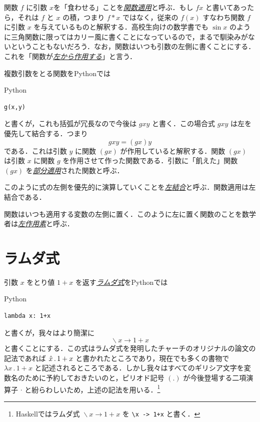 \documentclass[a4paper]{jsbook}
\newcommand{\programminglanguage}[1]{\textsf{#1}}
\newcommand{\haskell}{\programminglanguage{Haskell}}
\newcommand{\python}{\programminglanguage{Python}}
\newcommand{\keyword}[1]{{\underline{\emph{#1}}}}
\newcommand{\code}[1]{\texttt{#1}}
\newenvironment{pythoncode}{\begin{itembox}[r]{\python}}{\end{itembox}}
\DeclareMathOperator{\mLambda}{\backslash}
\DeclareMathOperator{\mLambdaArrow}{\rightarrow}
\newcommand{\mLambdaExp}[2]{\mLambda{#1}\mLambdaArrow{#2}}
\begin{document}

関数 $f$ に引数 $x$を「食わせる」ことを\keyword{関数適用}と呼ぶ．もし $fx$ と書いてあったら，それは $f$ と $x$ の積，つまり $f*x$ ではなく，従来の $f(x)$ すなわち関数 $f$ に引数 $x$ を与えているものと解釈する．高校生向けの数学書でも $\sin x$ のように三角関数に限ってはカリー風に書くことになっているので，まるで馴染みがないということもないだろう．なお，関数はいつも引数の左側に書くことにする．これを「関数が\keyword{左から作用する}」と言う．

複数引数をとる関数を\python では
\begin{pythoncode}
\begin{verbatim}
g(x,y)
\end{verbatim}
\end{pythoncode}
と書くが，これも括弧が冗長なので今後は $gxy$ と書く．この場合式 $gxy$ は左を優先して結合する．つまり
\begin{equation}
gxy=(gx)y
\end{equation}
である．これは引数 $y$ に関数 $(gx)$ が作用していると解釈する．関数 $(gx)$ は引数 $x$ に関数 $g$ を作用させて作った関数である．引数に「飢えた」関数 $(gx)$ を\keyword{部分適用}された関数と呼ぶ．

このように式の左側を優先的に演算していくことを\keyword{左結合}と呼ぶ．関数適用は左結合である．

関数はいつも適用する変数の左側に置く．このように左に置く関数のことを数学者は\keyword{左作用素}と呼ぶ．

\section{ラムダ式}

引数 $x$ をとり値 $1+x$ を返す\keyword{ラムダ式}を\python では
\begin{pythoncode}
\begin{verbatim}
lambda x: 1+x
\end{verbatim}
\end{pythoncode}
と書くが，我々はより簡潔に
\begin{equation}
\mLambdaExp{x}{1+x}
\end{equation}
と書くことにする．この式はラムダ式を発明したチャーチのオリジナルの論文の記法であれば $\Hat{x}\,.\,1+x$ と書かれたところであり，現在でも多くの書物で $\lambda x\,.\,1+x$ と記述されるところである．しかし我々はすべてのギリシア文字を変数名のために予約しておきたいのと，ピリオド記号 $(.)$ が今後登場する二項演算子 $\cdot$ と紛らわしいため，上述の記法を用いる．\footnote{\haskell ではラムダ式 $\mLambdaExp{x}{1+x}$ を \code{\textbackslash x -> 1+x} と書く．}
\end{document}
